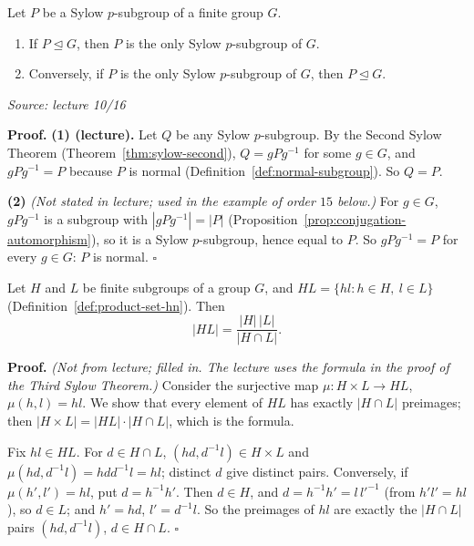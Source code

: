 \documentclass[11pt]{report}
\renewenvironment{proof}[1][Proof]{\noindent\textbf{#1.} }{\hfill$\square$\par\vspace{5pt}}
\newcommand{\srcline}[1]{\par\hfill{\footnotesize\textit{Source: #1}}}
\begin{document}
\begin{corbox}\label{cor:sylow-normal-unique}
Let $P$ be a Sylow $p$-subgroup of a finite group $G$.
\begin{enumerate}
    \item If $P \trianglelefteq G$, then $P$ is the only Sylow $p$-subgroup of $G$.
    \item Conversely, if $P$ is the only Sylow $p$-subgroup of $G$, then $P \trianglelefteq G$.
\end{enumerate}
\srcline{lecture 10/16}
\end{corbox}

\begin{proof}
\textbf{(1) (lecture).} Let $Q$ be any Sylow $p$-subgroup. By the Second Sylow Theorem (Theorem~\ref{thm:sylow-second}), $Q = gPg^{-1}$ for some $g \in G$, and $gPg^{-1} = P$ because $P$ is normal (Definition~\ref{def:normal-subgroup}). So $Q = P$.

\textbf{(2)} \textit{(Not stated in lecture; used in the example of order $15$ below.)} For $g \in G$, $gPg^{-1}$ is a subgroup with $|gPg^{-1}| = |P|$ (Proposition~\ref{prop:conjugation-automorphism}), so it is a Sylow $p$-subgroup, hence equal to $P$. So $gPg^{-1} = P$ for every $g \in G$: $P$ is normal.
\end{proof}

\begin{lembox}\label{lem:order-product-subgroups}
Let $H$ and $L$ be finite subgroups of a group $G$, and $HL = \{hl : h \in H,\ l \in L\}$ (Definition~\ref{def:product-set-hn}). Then
\[ |HL| = \frac{|H|\,|L|}{|H \cap L|}. \]
\end{lembox}

\begin{proof}
\textit{(Not from lecture; filled in. The lecture uses the formula in the proof of the Third Sylow Theorem.)} Consider the surjective map $\mu : H \times L \to HL$, $\mu(h, l) = hl$. We show that every element of $HL$ has exactly $|H \cap L|$ preimages; then $|H \times L| = |HL| \cdot |H \cap L|$, which is the formula.

Fix $hl \in HL$. For $d \in H \cap L$, $(hd, d^{-1}l) \in H \times L$ and $\mu(hd, d^{-1}l) = hdd^{-1}l = hl$; distinct $d$ give distinct pairs. Conversely, if $\mu(h', l') = hl$, put $d = h^{-1}h'$. Then $d \in H$, and $d = h^{-1}h' = l\,l'^{-1}$ (from $h'l' = hl$), so $d \in L$; and $h' = hd$, $l' = d^{-1}l$. So the preimages of $hl$ are exactly the $|H \cap L|$ pairs $(hd, d^{-1}l)$, $d \in H \cap L$.
\end{proof}
\end{document}
